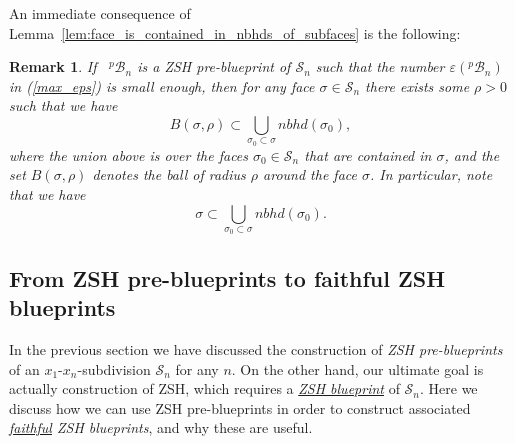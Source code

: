 \documentclass[12pt,letterpaper]{article}
\newtheorem{rem}[thm]{Remark}
\renewcommand{\S}{\mathcal{S}}
\newcommand{\B}{\mathcal{B}}
\newcommand{\eps}{\varepsilon}
\newcommand{\nbhd}{\mathit{nbhd}}
\begin{document}
\bigskip


\noindent
An immediate consequence of Lemma~\ref{lem:face_is_contained_in_nbhds_of_subfaces} is the following:

\begin{rem}
\label{rem:neighborhood_of_face_inside_union_of_nbhds}
If  \,  $^p\!\B_n$ is a ZSH pre-blueprint of $\S_n$ such that the number $\eps(^p\!\B_n)$ in (\ref{max_eps}) is small enough,
then for any face $\sigma \in \S_n$ there exists some $\rho>0$ such that  we have 
%
\begin{equation}
\label{eqn:neighborhood_of_face_inside_union_of_nbhds}
B(\sigma, \rho) \subset \bigcup_{\sigma_0 \subset \sigma} \nbhd(\sigma_0),
\end{equation}
%
where the union above is over the faces $\sigma_0 \in \S_n$ that are contained in $\sigma$, and the set $B(\sigma, \rho)$ denotes the ball of radius $\rho$ around the face $\sigma$.
In particular, note that we have 
%
\begin{equation}
\label{eqn:face_inside_union_of_nbhds}
\sigma \subset \bigcup_{\sigma_0 \subset \sigma} \nbhd(\sigma_0).
\end{equation}
%
\end{rem}






\bigskip



\bigskip



\bigskip



\bigskip





 









\newpage


\subsection{From  ZSH pre-blueprints  to  faithful ZSH blueprints 
}
\label{subsection:from_ZSH_pre-blueprints_to_faithful_ZSH_blueprints}

In the previous section we have discussed the construction of {\em ZSH pre-blueprints} of an $x_1$-$x_n$-subdivision $\S_n$ for any $n$. On the other hand, our ultimate goal is actually construction of ZSH,  which requires  a \ul{\em ZSH blueprint} of $\S_n$. Here we discuss how we can use ZSH pre-blueprints in order to construct associated {\em \ul{faithful} ZSH blueprints}, and why these are useful.
\end{document}
